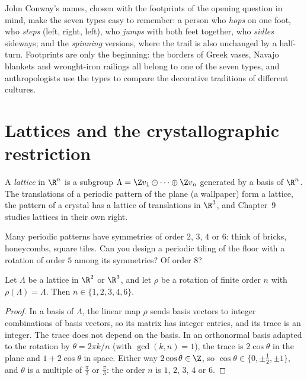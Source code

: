 John Conway's names, chosen with the footprints of the opening question in mind, make the seven types easy to remember: a person who
\emph{hops} on one foot, who \emph{steps} (left, right, left), who \emph{jumps} with both feet together, who \emph{sidles} sideways; and
the \emph{spinning} versions, where the trail is also unchanged by a half-turn. Footprints are only the beginning: the borders of Greek
vases, Navajo blankets and wrought-iron railings all belong to one of the seven types, and anthropologists use the types to compare
the decorative traditions of different cultures.

\section{Lattices and the crystallographic restriction}

A \emph{lattice} in $\R^n$ is a subgroup $\Lambda=\Z v_1\oplus\dots\oplus\Z v_n$ generated by a basis of $\R^n$. The translations of a
periodic pattern of the plane (a wallpaper) form a lattice, the pattern of a crystal has a lattice of translations in $\R^3$, and
Chapter~9 studies lattices in their own right.

\begin{think}
Many periodic patterns have symmetries of order $2$, $3$, $4$ or $6$: think of bricks, honeycombs, square tiles. Can you design a
periodic tiling of the floor with a rotation of order $5$ among its symmetries? Of order $8$?
\end{think}

\begin{theorem}\label{thm:crystallographic}
Let $\Lambda$ be a lattice in $\R^2$ or $\R^3$, and let $\rho$ be a rotation of finite order $n$ with $\rho(\Lambda)=\Lambda$. Then
$n\in\{1,2,3,4,6\}$.
\end{theorem}
\begin{proof}
In a basis of $\Lambda$, the linear map $\rho$ sends basis vectors to integer combinations of basis vectors, so its matrix has integer
entries, and its trace is an integer. The trace does not depend on the basis. In an orthonormal basis adapted to the rotation by
$\theta=2\pi k/n$ (with $\gcd(k,n)=1$), the trace is $2\cos\theta$ in the plane and $1+2\cos\theta$ in space. Either way
$2\cos\theta\in\Z$, so $\cos\theta\in\{0,\pm\frac12,\pm1\}$, and $\theta$ is a multiple of $\frac\pi2$ or $\frac\pi3$: the order $n$ is $1$,
$2$, $3$, $4$ or $6$.
\end{proof}

